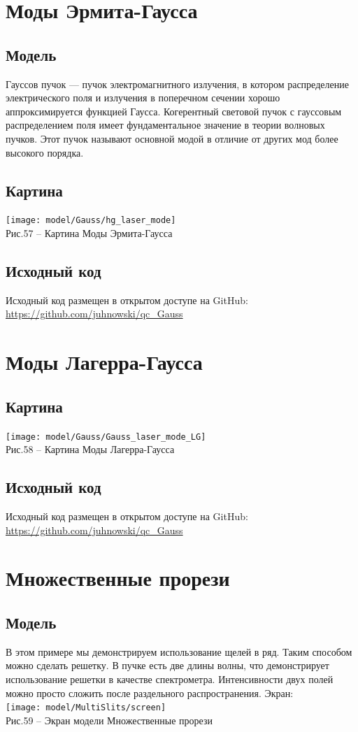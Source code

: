 \documentclass[11pt]{report}
\begin{document}
\section{Моды Эрмита-Гаусса}
\subsection{Модель}
Гауссов пучок — пучок электромагнитного излучения, в котором распределение электрического поля и излучения в поперечном сечении хорошо аппроксимируется функцией Гаусса. Когерентный световой пучок с гауссовым распределением поля имеет фундаментальное значение в теории волновых пучков. Этот пучок называют основной модой в отличие от других мод более высокого порядка.
\subsection{Картина}
\texttt{[image: model/Gauss/hg\_laser\_mode]} \\
Рис.57 -- Картина Моды Эрмита-Гаусса \\

\subsection{Исходный код}
Исходный код размещен в открытом доступе на GitHub: \url{https://github.com/juhnowski/qc_Gauss}\\

\section{Моды Лагерра-Гаусса}
\subsection{Картина}
\texttt{[image: model/Gauss/Gauss\_laser\_mode\_LG]} \\
Рис.58 -- Картина Моды Лагерра-Гаусса
\subsection{Исходный код}
Исходный код размещен в открытом доступе на GitHub: \url{https://github.com/juhnowski/qc_Gauss}\\

\section{Множественные прорези}
\subsection{Модель}
В этом примере мы демонстрируем использование щелей в ряд. Таким способом можно сделать решетку. В пучке есть две длины волны, что демонстрирует использование решетки в качестве спектрометра. Интенсивности двух полей можно просто сложить после раздельного распространения.
Экран: \\
\texttt{[image: model/MultiSlits/screen]} \\
Рис.59 -- Экран модели Множественные прорези \\
\end{document}

